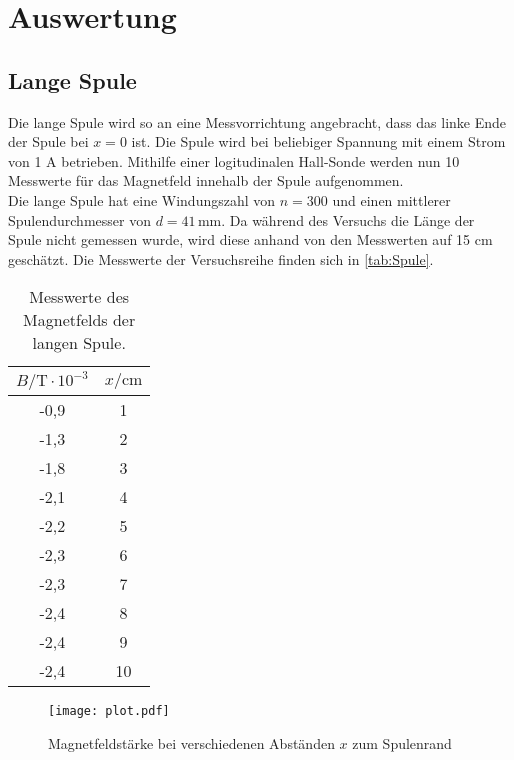 \section{Auswertung}
\label{sec:Auswertung}

\subsection{Lange Spule}

Die lange Spule wird so an eine Messvorrichtung angebracht, dass das linke Ende der Spule
bei $x=0$ ist. Die Spule wird bei beliebiger Spannung mit einem Strom von 1 A betrieben. Mithilfe einer
logitudinalen Hall-Sonde werden nun 10 Messwerte für das Magnetfeld innehalb der Spule aufgenommen. \\
Die lange Spule hat eine Windungszahl von $n=300$ und einen mittlerer Spulendurchmesser von $d = 41 \, \unit{\mm}$.
Da während des Versuchs die Länge der Spule nicht gemessen wurde, wird diese anhand von den Messwerten
auf 15 cm geschätzt. Die Messwerte der Versuchsreihe finden sich in \autoref{tab:Spule}.

\begin{table}
  \centering
  \caption{Messwerte des Magnetfelds der langen Spule.}
  \label{tab:Spule}
  \begin{tabular}{c c}
    \toprule
    $B/\unit{\tesla} \cdot 10^{-3}$ & $x/\unit{\cm}$ \\
    \midrule
     -0,9 & 1 \\
     -1,3 & 2 \\
     -1,8 & 3 \\
     -2,1 & 4 \\
     -2,2 & 5 \\
     -2,3 & 6 \\
     -2,3 & 7 \\
     -2,4 & 8 \\
     -2,4 & 9 \\
     -2,4 & 10 \\
    \bottomrule
  \end{tabular}
\end{table}

\begin{figure}
  \centering
  \texttt{[image: plot.pdf]}
  \caption{Magnetfeldstärke bei verschiedenen Abständen $x$ zum Spulenrand}
  \label{fig:Spule}
\end{figure}

